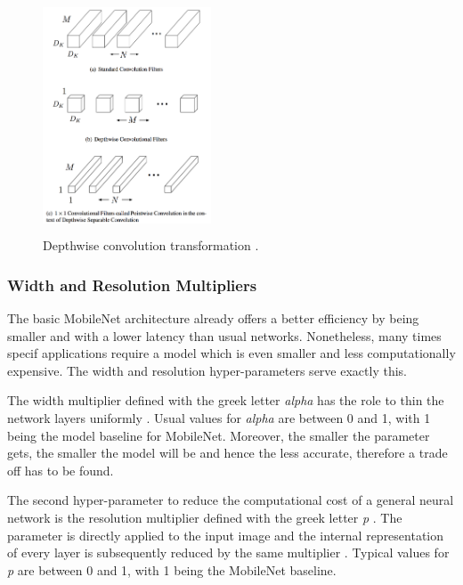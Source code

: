 \begin{figure}[!htbp]
\begin{center}
\includegraphics[width=5cm,height=7cm,keepaspectratio]{images/convolutions.png}
\end{center}
\caption{Depthwise convolution transformation \cite{paper:MobileNets}.}
\end{figure}

\subsubsection{Width and Resolution Multipliers}

The basic MobileNet architecture already offers a better efficiency by being smaller and with a lower latency than usual networks. Nonetheless, many times specif applications require a model which is even smaller and less computationally expensive. The width and resolution hyper-parameters serve exactly this.

The width multiplier defined with the greek letter \textit{alpha} has the role to thin the network layers uniformly \cite{paper:MobileNets}. Usual values for \textit{alpha} are between 0 and 1, with 1 being the model baseline for MobileNet. Moreover, the smaller the parameter gets, the smaller the model will be and hence the less accurate, therefore a trade off has to be found.

The second hyper-parameter to reduce the computational cost of a general neural network is the resolution multiplier defined with the greek letter \textit{p} \cite{paper:MobileNets}. The parameter is directly applied to the input image and the internal representation of every layer is subsequently reduced by the same multiplier \cite{paper:MobileNets}. Typical values for \textit{p} are between 0 and 1, with 1 being the MobileNet baseline.

